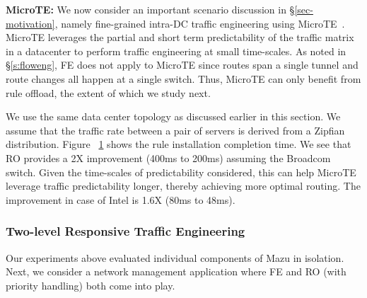 {\bf MicroTE:} We now consider an important scenario discussion in \S\ref{sec-motivation}, namely fine-grained intra-DC traffic engineering using MicroTE~\cite{microte}. MicroTE leverages the partial and short term predictability of the traffic matrix in a datacenter to perform traffic engineering at small time-scales.  As noted in \S\ref{s:floweng}, FE does not apply to MicroTE since routes span a single tunnel and route changes all happen at a single switch. Thus, MicroTE can only benefit from rule offload, the extent of which we study next.







We use the same data center topology as discussed earlier in this section. We assume that the traffic rate between a pair of servers is derived from a Zipfian distribution.  Figure ~\ref{microteResults} shows the rule installation completion time. We see that RO provides a 2X improvement (400ms to 200ms) assuming the Broadcom switch. Given the time-scales of predictability considered, this can help MicroTE leverage traffic predictability longer, thereby achieving more optimal routing. The improvement in case of Intel is 1.6X (80ms to 48ms).


\begin{figure}[!tb]
\centering
{}
\vspace{-1em}
\label{microteResults}
\end{figure}

\subsubsection{Two-level Responsive Traffic Engineering} 

Our experiments above evaluated individual components of Mazu in isolation. Next, we consider a network management application where FE and RO (with priority handling) both come into play.

